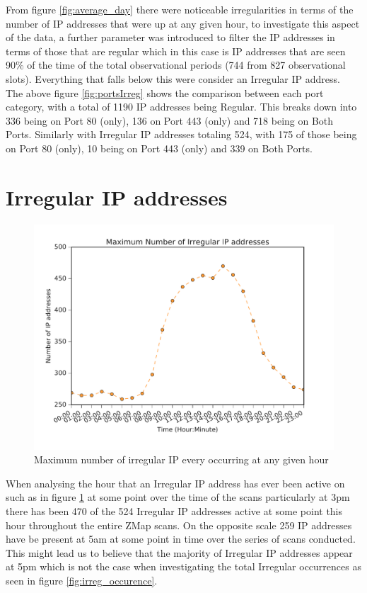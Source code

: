 \documentclass[a4wide,leqno,12pt]{report}
\begin{document}
From figure \ref{fig:average_day} there were noticeable irregularities in terms of the number of IP addresses that were up at any given hour, to investigate this aspect of the data, a further parameter was introduced to filter the IP addresses in terms of those that are regular which in this case is
IP addresses that are seen 90\% of the time of the total observational periods (744 from 827 observational slots). Everything that falls below this were consider an Irregular IP address.\\

The above figure \ref{fig:portsIrreg} shows the comparison between each port category, with a total of 1190 IP addresses being Regular. This breaks down into 336 being on Port 80 (only), 136 on Port 443 (only) and 718 being on Both Ports. Similarly with Irregular IP addresses totaling 524, with 175 of those being on Port 80 (only), 10 being on Port 443 (only) and 339 on Both Ports.

\section{Irregular IP addresses}
\begin{figure}[H]
\centering
\includegraphics[scale=.5]{pdf_images/MaximumNumberOfIrregularIPaddressesInAnAverageDay}
\caption{Maximum number of irregular IP every occurring at any given hour}
\label{fig:irreg_ips}
\end{figure}
When analysing the hour that an Irregular IP address has ever been active on such as in figure \ref{fig:irreg_ips} at some point over the time of the scans particularly at 3pm there has been 470 of the 524 Irregular IP addresses active at some point this hour throughout the entire ZMap scans. On the opposite scale 259 IP addresses have be present at 5am at some point in time over the series of scans conducted. This might lead us to believe that the majority of Irregular IP addresses appear at 5pm which is not the case when investigating the total Irregular occurrences as seen in figure \ref{fig:irreg_occurence}.
\end{document}
